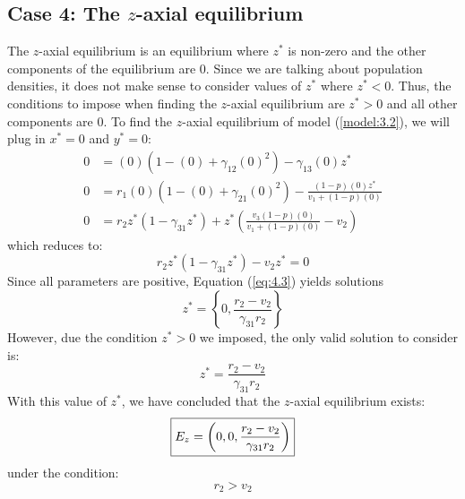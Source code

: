 \subsection{Case 4: The $z$-axial equilibrium}\label{subsec:z_axial_equilibrium}
The $z$-axial equilibrium is an equilibrium where $z^*$ is non-zero and the other components of the equilibrium are 0. Since we are talking about population densities, it does not make sense to consider values of $z^*$ where $z^*<0$. Thus, the conditions to impose when finding the $z$-axial equilibrium are $z^*>0$ and all other components are 0. To find the $z$-axial equilibrium of model (\ref{model:3.2}), we will plug in $x^*=0$ and $y^*=0$:
\begin{align*}
    0 &= (0)\left(1-(0)+\gamma_{12}(0)^2\right)-\gamma_{13}(0)z^*\\
    0 &= r_1(0)\left(1-(0)+\gamma_{21}(0)^2\right)-\frac{\left(1-p\right)(0)z^*}{v_1+\left(1-p\right)(0)}\\
    0 &= r_2z^*\left(1-\gamma_{31}z^*\right)+z^*\left(\frac{v_3\left(1-p\right)(0)}{v_1+\left(1-p\right)(0)}-v_2\right)
\end{align*}
which reduces to:
\begin{equation}
    r_2z^*\left(1-\gamma_{31}z^*\right)-v_2z^*=0
    \label{eq:4.4}
\end{equation}
Since all parameters are positive, Equation (\ref{eq:4.3}) yields solutions
\[
z^*=\left\{0, \frac{r_2-v_2}{\gamma_{31}r_2}\right\}
\]
However, due the condition $z^*>0$ we imposed, the only valid solution to consider is:
\[
z^*=\frac{r_2-v_2}{\gamma_{31}r_2}
\]
With this value of $z^*$, we have concluded that the $z$-axial equilibrium exists:
\[
\fbox{$\displaystyle E_z=\left(
0,
0,
\frac{r_2-v_2}{\gamma_{31}r_2}
\right)$}
\]
under the condition:
\[
r_2>v_2
\]


